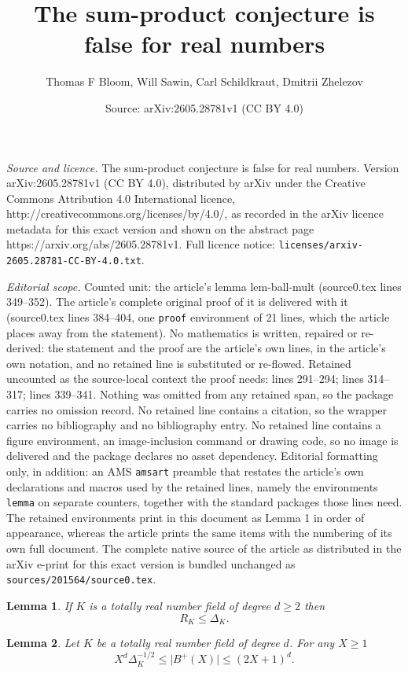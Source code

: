 \documentclass[10pt,a4paper]{amsart}
\title{The sum-product conjecture is false for real numbers}
\author{Thomas F Bloom, Will Sawin, Carl Schildkraut, Dmitrii Zhelezov}
\date{Source: arXiv:2605.28781v1 (CC BY 4.0)}
\newtheorem{lemma}{Lemma}
\newcommand{\Abs}[1]{\lvert #1\rvert}
\begin{document}
\maketitle

\noindent\emph{Source and licence.} The sum-product conjecture is false for real numbers. Version arXiv:2605.28781v1 (CC BY 4.0), distributed by arXiv under the Creative Commons Attribution 4.0 International licence, http://creativecommons.org/licenses/by/4.0/, as recorded in the arXiv licence metadata for this exact version and shown on the abstract page https://arxiv.org/abs/2605.28781v1. Full licence notice: \texttt{licenses/arxiv-2605.28781-CC-BY-4.0.txt}.\par\smallskip

\noindent\textit{Editorial scope.} Counted unit: the article's lemma lem-ball-mult (source0.tex lines 349--352). The article's complete original proof of it is delivered with it (source0.tex lines 384--404, one \texttt{proof} environment of 21 lines, which the article places away from the statement). No mathematics is written, repaired or re-derived: the statement and the proof are the article's own lines, in the article's own notation, and no retained line is substituted or re-flowed.  Retained uncounted as the source-local context the proof needs: lines 291--294; lines 314--317; lines 339--341.  Nothing was omitted from any retained span, so the package carries no omission record.  No retained line contains a citation, so the wrapper carries no bibliography and no bibliography entry.  No retained line contains a figure environment, an image-inclusion command or drawing code, so no image is delivered and the package declares no asset dependency.  Editorial formatting only, in addition: an AMS \texttt{amsart} preamble that restates the article's own declarations and macros used by the retained lines, namely the environments \texttt{lemma} on separate counters, together with the standard packages those lines need.  The retained environments print in this document as Lemma 1 in order of appearance, whereas the article prints the same items with the numbering of its own full document.  The complete native source of the article as distributed in the arXiv e-print for this exact version is bundled unchanged as \texttt{sources/201564/source0.tex}.
\begin{lemma}\label{lem-regbound}
If $K$ is a totally real number field of degree $d\geq 2$ then
\[R_K \leq \Delta_K.\]
\end{lemma}

\begin{lemma}\label{lem-ball}
Let $K$ be a totally real number field of degree $d$. For any $X\geq 1$
\[X^{d}\Delta_K^{-1/2}\leq \Abs{B^+(X)}\leq (2X+1)^{d}.\] 
\end{lemma}
\end{document}
